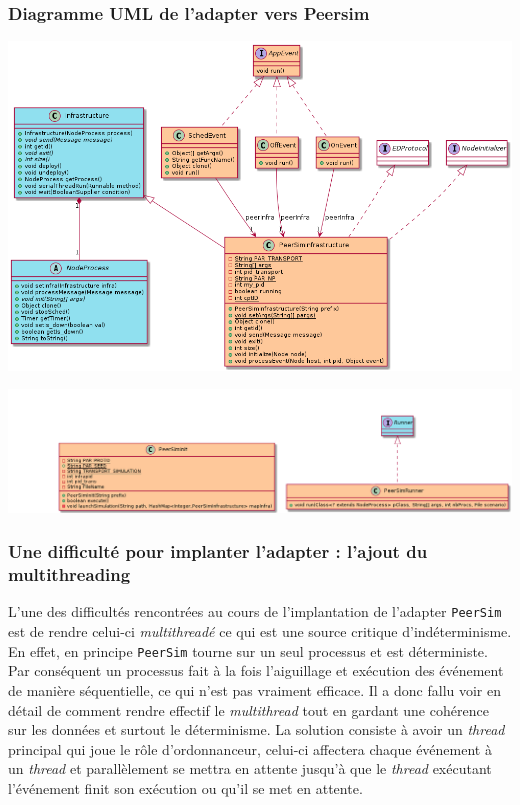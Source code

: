 \documentclass{article}
\begin{document}
							\subsubsection{Diagramme UML de l'adapter vers Peersim}
							\hspace*{-1.3cm} \includegraphics[width=17cm]{uml/peersim1.png}
		
							\hspace*{-3.2cm} \includegraphics[width=20cm]{uml/peersim2.png}
		
						\subsubsection{Une difficulté pour implanter l'adapter : l'ajout du multithreading}
						L’une des difficultés rencontrées au cours de l’implantation de l’adapter \verb|PeerSim| est de rendre celui-ci \emph{multithreadé} ce qui est une source critique d'indéterminisme.
						En effet, en principe \verb|PeerSim| tourne sur un seul processus et est déterministe. Par conséquent un processus fait à la fois l’aiguillage et exécution des événement de manière séquentielle, ce qui n’est pas vraiment efficace. Il a donc fallu voir en détail de comment rendre effectif le \emph{multithread} tout en gardant une cohérence sur les données et surtout le déterminisme.  
						La solution consiste à avoir un \emph{thread} principal qui joue le rôle d’ordonnanceur, celui-ci affectera chaque événement à un \emph{thread} et parallèlement se mettra en attente jusqu’à que le \emph{thread} exécutant l’événement finit son exécution ou qu’il se met en attente.
\end{document}
